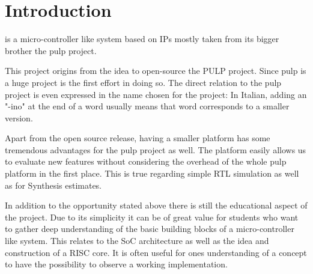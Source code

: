 
\chapter{Introduction}
\pulpino is a micro-controller like system based on IPs mostly taken from its bigger brother the \gls{pulp} project.

This project origins from the idea to open-source the PULP project. Since \gls{pulp} is a huge project \pulpino is
the first effort in doing so. The direct relation to the \gls{pulp} project is even expressed in the name chosen for
the project: In Italian, adding an "-ino" at the end of a word usually means that word corresponds to a smaller version.

Apart from the open source release, having a smaller platform has some tremendous advantages for the \gls{pulp} project as
well. The \pulpino platform easily allows us to evaluate new features without considering the overhead of the whole \gls{pulp}
platform in the first place. This is true regarding simple RTL simulation as well as for Synthesis estimates.

In addition to the opportunity stated above there is still the educational aspect of the project. Due to its simplicity
it can be of great value for students who want to gather deep understanding of the basic building blocks of a
micro-controller like system. This relates to the SoC architecture as well as the idea and construction of a RISC core.
It is often useful for ones understanding of a concept to have the possibility to observe a working implementation.

